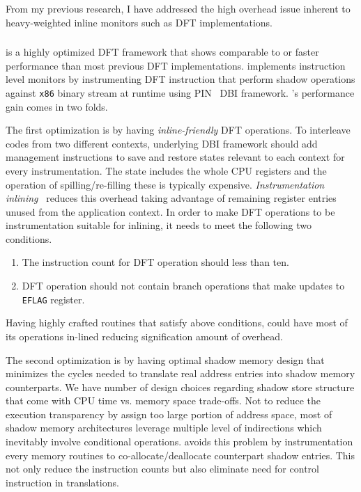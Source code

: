 From my previous research, I have addressed the high overhead issue inherent to
heavy-weighted inline monitors such as DFT implementations.

\subsubsection{\libdft}

\libdft is a highly optimized DFT framework that shows comparable to or faster
performance than most previous DFT implementations. \libdft implements
instruction level monitors by instrumenting DFT instruction that perform shadow
operations against {\tt x86} binary stream at runtime using PIN~\cite{} DBI
framework.
%
\libdft's performance gain comes in two folds. 

The first optimization is by having {\it inline-friendly} DFT operations. To
interleave codes from two different contexts, underlying DBI framework should
add management instructions to save and restore states relevant to each context
for every instrumentation. The state includes the whole CPU registers and the
operation of spilling/re-filling these is typically expensive. {\it
Instrumentation inlining}~\cite{} reduces this overhead taking advantage of
remaining register entries unused from the application context. In order to
make DFT operations to be instrumentation suitable for inlining, it needs to
meet the following two conditions.
%
\begin{enumerate} \item The instruction count for DFT operation should less
than ten.  \item DFT operation should not contain branch operations that make
updates to {\tt EFLAG} register.  \end{enumerate} 
%
Having highly crafted routines that satisfy above conditions, \libdft could
have most of its operations in-lined reducing signification amount of overhead.

The second optimization is by having optimal shadow memory design that
minimizes the cycles needed to translate real address entries into shadow
memory counterparts. We have number of design choices regarding shadow store
structure that come with CPU time vs. memory space trade-offs. Not to reduce
the execution transparency by assign too large portion of address space, most
of shadow memory architectures leverage multiple level of indirections which
inevitably involve conditional operations. \libdft avoids this problem by
instrumentation every memory routines to co-allocate/deallocate counterpart
shadow entries. This not only reduce the instruction counts but also eliminate
need for control instruction in translations.

